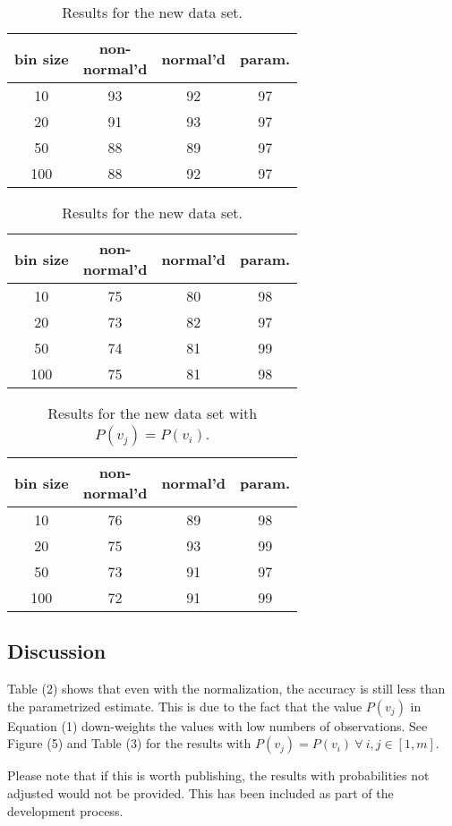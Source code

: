 \begin{table}[H]
\parbox{.45\linewidth}
{
  \centering
  \begin{tabular}{ c | c c c }
    bin size & \specialcell{non-\\normal'd} & normal'd & param. \\
    \hline
    10  & 93 & 92 & 97 \\
    20  & 91 & 93 & 97 \\
    50  & 88 & 89 & 97 \\
    100 & 88 & 92 & 97 \\
  \end{tabular}
  \caption{Results for the original data set.}
  \label{tbl:tablelabel}
}
\hfill
\parbox{.45\linewidth}
{
  \centering
  \begin{tabular}{ c | c c c }
    bin size & \specialcell{non-\\normal'd} & normal'd & param. \\
    \hline
    10  & 75 & 80 & 98 \\
    20  & 73 & 82 & 97 \\
    50  & 74 & 81 & 99 \\
    100 & 75 & 81 & 98 \\
  \end{tabular}
  \caption{Results for the new data set.}
  \label{tbl:tablelabel}
}
\end{table}

\begin{table}[H] 
\centering
\begin{tabular}{ c | c c c }
  bin size & \specialcell{non-\\normal'd} & normal'd & param. \\
  \hline
  10  & 76 & 89 & 98 \\
  20  & 75 & 93 & 99 \\
  50  & 73 & 91 & 97 \\
  100 & 72 & 91 & 99 \\
\end{tabular}
\caption{Results for the new data set with $P(v_j) = P(v_i)$.}
\label{tbl:tablelabel}
\end{table}

\subsection*{Discussion}

Table (2) shows that even with the normalization, the accuracy is still less than the parametrized estimate.  This is due to the fact that the value $P(v_j)$ in Equation (1) down-weights the values with low numbers of observations.  See Figure (5) and Table (3) for the results with $P(v_j) = P(v_i)\ \forall\ i,j \in [1,m]$.

Please note that if this is worth publishing, the results with probabilities not adjusted would not be provided.  This has been included as part of the development process.
 






